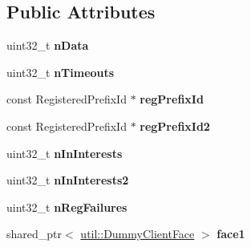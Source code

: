 \subsection*{Public Attributes}
\begin{DoxyCompactItemize}
\item 
uint32\+\_\+t {\bfseries n\+Data}\hypertarget{classndn_1_1tests_1_1FacesFixture_adab8dafdc483266ac71ae9323d4e5b51}{}\label{classndn_1_1tests_1_1FacesFixture_adab8dafdc483266ac71ae9323d4e5b51}

\item 
uint32\+\_\+t {\bfseries n\+Timeouts}\hypertarget{classndn_1_1tests_1_1FacesFixture_a6574e80b35e2397558c58a6ebb4fc10a}{}\label{classndn_1_1tests_1_1FacesFixture_a6574e80b35e2397558c58a6ebb4fc10a}

\item 
const Registered\+Prefix\+Id $\ast$ {\bfseries reg\+Prefix\+Id}\hypertarget{classndn_1_1tests_1_1FacesFixture_abacf6cd37ba8cf83ba2adadb4c6f413d}{}\label{classndn_1_1tests_1_1FacesFixture_abacf6cd37ba8cf83ba2adadb4c6f413d}

\item 
const Registered\+Prefix\+Id $\ast$ {\bfseries reg\+Prefix\+Id2}\hypertarget{classndn_1_1tests_1_1FacesFixture_a0e6079fae1de6b79077471ad4ff913f4}{}\label{classndn_1_1tests_1_1FacesFixture_a0e6079fae1de6b79077471ad4ff913f4}

\item 
uint32\+\_\+t {\bfseries n\+In\+Interests}\hypertarget{classndn_1_1tests_1_1FacesFixture_a82bb029753ed6bace7c3b492e3a7a735}{}\label{classndn_1_1tests_1_1FacesFixture_a82bb029753ed6bace7c3b492e3a7a735}

\item 
uint32\+\_\+t {\bfseries n\+In\+Interests2}\hypertarget{classndn_1_1tests_1_1FacesFixture_a1d34ec6e41fc3eaba4df4d7532f15057}{}\label{classndn_1_1tests_1_1FacesFixture_a1d34ec6e41fc3eaba4df4d7532f15057}

\item 
uint32\+\_\+t {\bfseries n\+Reg\+Failures}\hypertarget{classndn_1_1tests_1_1FacesFixture_a9bad246d7c6300a85b326f55d13433e8}{}\label{classndn_1_1tests_1_1FacesFixture_a9bad246d7c6300a85b326f55d13433e8}

\item 
shared\+\_\+ptr$<$ \hyperlink{classndn_1_1util_1_1DummyClientFace}{util\+::\+Dummy\+Client\+Face} $>$ {\bfseries face1}\hypertarget{classndn_1_1tests_1_1FacesFixture_a4d35e9378a08eafaf3246c729976e61c}{}\label{classndn_1_1tests_1_1FacesFixture_a4d35e9378a08eafaf3246c729976e61c}


\end{DoxyCompactItemize}

